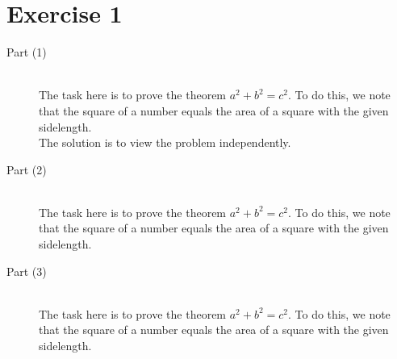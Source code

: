 \section*{Exercise 1}
\label{sec:s1}

%


\begin{description}
  \item[Part (1)] ~\\
    The task here is to prove the theorem $a^2 + b^2 = c^2$. To do this, we note that the square of a number equals the area of a square with the given sidelength. \\

    The solution is to view the problem independently.
  \item[Part (2)] ~\\
    The task here is to prove the theorem $a^2 + b^2 = c^2$. To do this, we note that the square of a number equals the area of a square with the given sidelength.
  \item[Part (3)] ~\\
    The task here is to prove the theorem $a^2 + b^2 = c^2$. To do this, we note that the square of a number equals the area of a square with the given sidelength.
\end{description}
